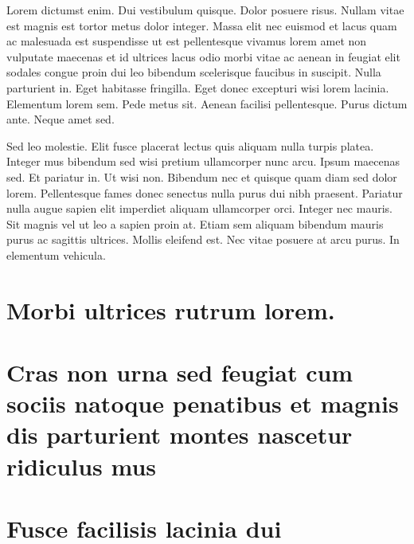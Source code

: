 Lorem dictumst enim. Dui vestibulum quisque. Dolor posuere risus. Nullam vitae est magnis est tortor metus dolor integer. Massa elit nec euismod et lacus quam ac malesuada est suspendisse ut est pellentesque vivamus lorem amet non vulputate maecenas et id ultrices lacus odio morbi vitae ac aenean in feugiat elit sodales congue proin dui leo bibendum scelerisque faucibus in suscipit. Nulla parturient in. Eget habitasse fringilla. Eget donec excepturi wisi lorem lacinia. Elementum lorem sem. Pede metus sit. Aenean facilisi pellentesque. Purus dictum ante. Neque amet sed.

Sed leo molestie. Elit fusce placerat lectus quis aliquam nulla turpis platea. Integer mus bibendum sed wisi pretium ullamcorper nunc arcu. Ipsum maecenas sed. Et pariatur in. Ut wisi non. Bibendum nec et quisque quam diam sed dolor lorem. Pellentesque fames donec senectus nulla purus dui nibh praesent. Pariatur nulla augue sapien elit imperdiet aliquam ullamcorper orci. Integer nec mauris. Sit magnis vel ut leo a sapien proin at. Etiam sem aliquam bibendum mauris purus ac sagittis ultrices. Mollis eleifend est. Nec vitae posuere at arcu purus. In elementum vehicula.


\chapter{Morbi ultrices rutrum lorem.}

\lipsum[30]


\chapter{Cras non urna sed feugiat cum sociis natoque penatibus et magnis dis parturient montes nascetur ridiculus mus}

\lipsum[31]

\chapter{Fusce facilisis lacinia dui}

\lipsum[32]